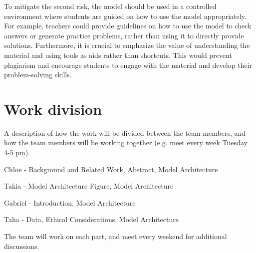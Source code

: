 \documentclass{article}
\begin{document}
To mitigate the second risk, the model should be used in a controlled environment where students are guided on how to use the model appropriately. For example, teachers could provide guidelines on how to use the model to check answers or generate practice problems, rather than using it to directly provide solutions. Furthermore, it is crucial to emphasize the value of understanding the material and using tools as aids rather than shortcuts. This would prevent plagiarism and encourage students to engage with the material and develop their problem-solving skills.

\section{Work division}

A description of how the work will be divided between
the team members, and how the team members will be
working together (e.g. meet every week Tuesday 4-5
pm).

Chloe - Background and Related Work, Abstract, Model Architecture

Takia - Model Architecture Figure, Model Architecture

Gabriel - Introduction, Model Architecture

Taha - Data, Ethical Considerations, Model Architecture

The team will work on each part, and meet every weekend for additional discussions. 





\end{document}
